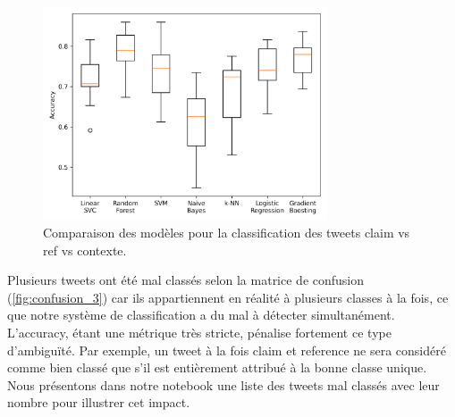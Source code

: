 \newpage
\begin{figure}[H]
    \centering
    \includegraphics[width=0.75\textwidth]{images/model_comparison_3}
    \caption{Comparaison des modèles pour la classification des tweets claim vs ref vs contexte.}
    \label{fig:model_comparison_clm_ref_context}
\end{figure}

Plusieurs tweets ont été mal classés selon la matrice de confusion (\autoref{fig:confusion_3}) car ils appartiennent en réalité à plusieurs classes à la fois, ce que notre système de classification a du mal à détecter simultanément.
L’accuracy, étant une métrique très stricte, pénalise fortement ce type d’ambiguïté.
Par exemple, un tweet à la fois claim et reference ne sera considéré comme bien classé que s’il est entièrement attribué à la bonne classe unique.
Nous présentons dans notre notebook une liste des tweets mal classés avec leur nombre pour illustrer cet impact.
